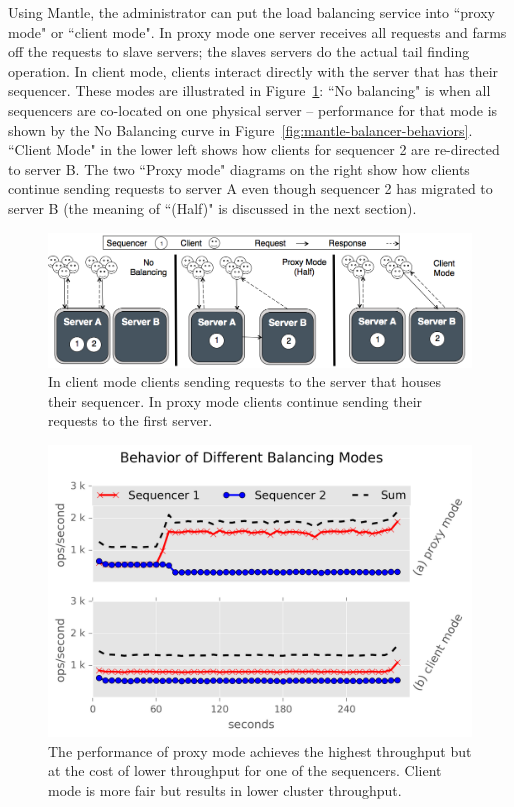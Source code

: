 \documentclass[preprint]{sigplanconf-eurosys}
\begin{document}
Using Mantle, the administrator can put the load balancing service into ``proxy
mode" or ``client mode". In proxy mode one server receives all requests and
farms off the requests to slave servers; the slaves servers do the actual tail
finding operation. In client mode, clients interact directly with the server
that has their sequencer.  These modes are illustrated in
Figure~\ref{fig:mantle-modes}: ``No balancing" is when all sequencers are
co-located on one physical server -- performance for that mode is shown by the
No Balancing curve in Figure~\ref{fig:mantle-balancer-behaviors}.  ``Client
Mode" in the lower left shows how clients for sequencer 2 are re-directed to
server B. The two ``Proxy mode" diagrams on the right show how clients continue
sending requests to server A even though sequencer 2 has migrated to server B
(the meaning of ``(Half)" is discussed in the next section).

\begin{figure}[t!]
\centering
\includegraphics{figures/mantle-modes.png}
\caption{ In client mode clients sending requests to the server that houses
their sequencer. In proxy mode clients continue sending their requests to the
first server.  }\label{fig:mantle-modes}
\end{figure}

\begin{figure}[t!]
\centering
\includegraphics{figures/mantle-mode-behavior.png}
\caption{The performance of proxy mode achieves the highest throughput but at
the cost of lower throughput for one of the sequencers. Client mode is more
fair but results in lower cluster throughput.
}\label{fig:mantle-mode-behavior}
\end{figure}
\end{document}
